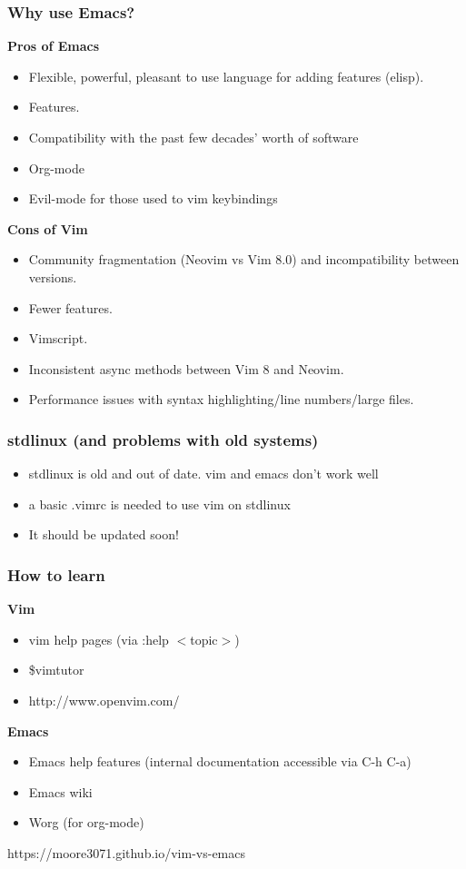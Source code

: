 \documentclass[8pt]{beamer}
\begin{document}
\begin{frame}
  \frametitle{Why use Emacs?}
  \begin{multicols}{2}
    \textbf{Pros of Emacs}
    \begin{itemize}
      \item Flexible, powerful, pleasant to use language for adding
        features (elisp).
      \item Features.
      \item Compatibility with the past few decades' worth of software
      \item Org-mode
      \item Evil-mode for those used to vim keybindings
    \end{itemize}
    \columnbreak
    \textbf{Cons of Vim}
    \begin{itemize}
      \item Community fragmentation (Neovim vs Vim 8.0) and
        incompatibility between versions.
      \item Fewer features.
      \item Vimscript.
      \item Inconsistent async methods between Vim 8 and Neovim.
      \item Performance issues with syntax highlighting/line
        numbers/large files.
    \end{itemize}
  \end{multicols}
\end{frame}

\begin{frame}
  \frametitle{stdlinux (and problems with old systems)}
        \begin{itemize}
          \item stdlinux is old and out of date. vim and emacs don't work well
          \item a basic .vimrc is needed to use vim on stdlinux
          \item It should be updated soon!
        \end{itemize}
\end{frame}

\begin{frame}
  \frametitle{How to learn}
  \textbf{Vim}
  \begin{itemize}
    \item vim help pages (via :help $<$topic$>$)
    \item \$vimtutor
    \item http://www.openvim.com/
  \end{itemize}
  \textbf{Emacs}
  \begin{itemize}
    \item Emacs help features (internal documentation accessible via C-h C-a)
    \item Emacs wiki
    \item Worg (for org-mode)
  \end{itemize}
\end{frame}

\begin{frame}
  \Huge{https://moore3071.github.io/vim-vs-emacs}
\end{frame}
\end{document}
